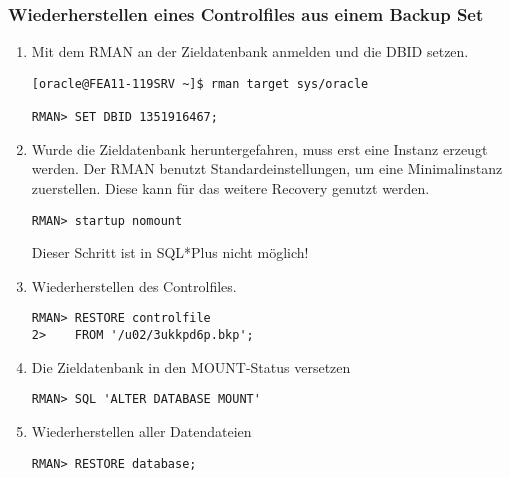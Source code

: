         \subsubsection{Wiederherstellen eines Controlfiles aus einem Backup Set}
          \begin{enumerate}
            \item Mit dem RMAN an der Zieldatenbank anmelden und die DBID setzen.
              \begin{lstlisting}[caption={An der Zieldatenbank anmelden und die DBID setzen},label=admin1524,language=rman]
[oracle@FEA11-119SRV ~]$ rman target sys/oracle

RMAN> SET DBID 1351916467;
                  \end{lstlisting}
            \item Wurde die Zieldatenbank heruntergefahren, muss erst eine Instanz erzeugt werden. Der RMAN benutzt Standardeinstellungen, um eine Minimalinstanz zuerstellen. Diese kann für das weitere Recovery genutzt werden.
              \begin{lstlisting}[caption={Zieldatenbank im RMAN in den NOMOUNT-Status bringen},label=admin1525,language=rman,alsolanguage=sqlplus]
RMAN> startup nomount
              \end{lstlisting}
              \begin{merke}
                Dieser Schritt ist in SQL*Plus nicht möglich!
              \end{merke}
            \item Wiederherstellen des Controlfiles.
              \begin{lstlisting}[caption={Wiederherstellen des Controlfiles},label=admin1526,language=rman]
RMAN> RESTORE controlfile
2>    FROM '/u02/3ukkpd6p.bkp';
              \end{lstlisting}
            \item Die Zieldatenbank in den MOUNT-Status versetzen
              \begin{lstlisting}[caption={Zieldatenbank mounten},label=admin1527,language=rman,emph={[9]ALTER,DATABASE,MOUNT},emphstyle={[9]\color{magenta}\bfseries}]
RMAN> SQL 'ALTER DATABASE MOUNT'
              \end{lstlisting}
            \item Wiederherstellen aller Datendateien
              \begin{lstlisting}[caption={Datendateien wiederherstellen},label=admin1528,language=rman]
RMAN> RESTORE database;
              \end{lstlisting}

\end{enumerate}
